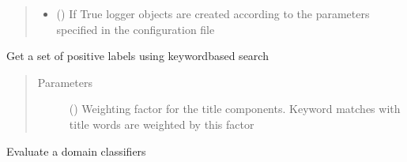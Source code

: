 \documentclass[letterpaper,10pt,english]{sphinxmanual}
\begin{document}
\begin{fulllineitems}
\begin{fulllineitems}
\begin{quote}
\begin{description}
\begin{itemize}
\item {} 
\sphinxAtStartPar
{} () \textendash{} If True logger objects are created according to the parameters
specified in the configuration file

\end{itemize}

\end{description}\end{quote}

\end{fulllineitems}


\begin{fulllineitems}
\label{\detokenize{dc_task_manager:src.task_manager.TaskManager.analyze_keywords}}
\sphinxAtStartPar
Get a set of positive labels using keyword\sphinxhyphen{}based search
\begin{quote}\begin{description}
\item[{Parameters}] \leavevmode
\sphinxAtStartPar
{} () \textendash{} Weighting factor for the title components. Keyword matches with
title words are weighted by this factor

\end{description}\end{quote}

\end{fulllineitems}


\begin{fulllineitems}
\label{\detokenize{dc_task_manager:src.task_manager.TaskManager.evaluate_PUmodel}}
\sphinxAtStartPar
Evaluate a domain classifiers

\end{fulllineitems}



\end{fulllineitems}
\end{document}
